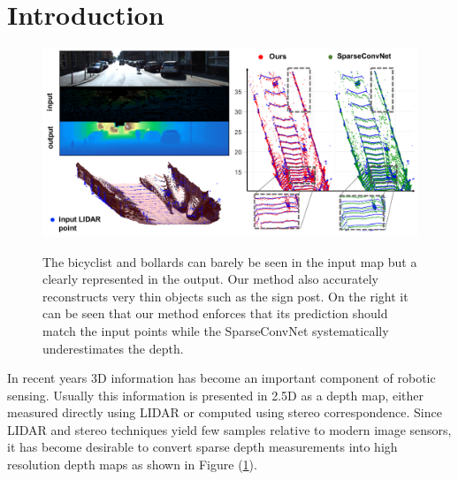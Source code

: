 \section{Introduction}
\begin{figure}
\centering
  \includegraphics[width=\textwidth]{figs/keyfig.pdf}\\
  \caption{The bicyclist and bollards can barely be seen in the input map but a clearly represented in the output. Our method also accurately reconstructs very thin objects such as the sign post. On the right it can be seen that our method enforces that its prediction should match the input points while the SparseConvNet systematically underestimates the depth.}
  \label{fig:intro}
\end{figure}
In recent years 3D information has become an important component of robotic sensing. Usually this information is presented in 2.5D as a depth map, either measured directly using LIDAR or computed using stereo correspondence. Since LIDAR and stereo techniques yield few samples relative to modern image sensors, it has become desirable to convert sparse depth measurements into high resolution depth maps as shown in Figure (\ref{fig:intro}).


